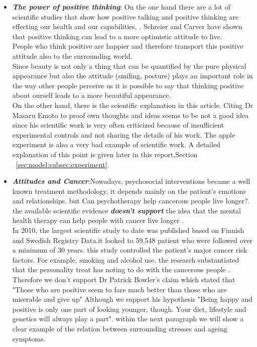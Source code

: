 \documentclass[12pt]{article}
\theoremstyle{plain}
\theoremstyle{definition}
\theoremstyle{remark}
\begin{document}
\begin{itemize}
\item \textit{\textbf{The power of positive thinking}}:
On the one hand there are a lot of scientific studies that show how positive talking and positive thinking are effecting our health and our capabilities. \cite{Macleod2000,Oettingen1991,Ayres1988}. Schreier and Carver \cite{Scheier1993} have shown that positive thinking can lead to a more optimistic attitude to live.\\
People who think positive are happier and therefore transport this positive attitude also to the surrounding world.\\
Since beauty is not only a thing that can be quantified by the pure physical appearance but also the attitude (smiling, posture) plays an important role in the way other people perceive us it is possible to say that thinking positive about ourself leads to a more beautiful appearance.\\
On the other hand, there is the scientific explanation in this article. Citing Dr Masaru Emoto to proof own thoughts and ideas seems to be not a good idea since his scientific work is very often criticized because of insufficient experimental controls and not sharing the details of his work. The apple experiment is also a very bad example of scientific work. A detailed explanation of this point is given later in this report,Section ~\ref{sec:model:subsec:experiment}. 
\end{itemize}


\begin{itemize}
\item \textit{ \textbf{Attitudes and Cancer}}:Nowadays, psychosocial interventions became a well known treatment methodology, it depends mainly on the patient's emotions and relationships. but Can psychotherapy help cancerous people live longer?. the available scientific evidence \textbf{ \textit{doesn't support}} the idea that the mental health therapy can help people with cancer live longer \cite{chow2004does} \cite{ross2002mind} \cite{boyles2011positive}. \\
In 2010, the largest scientific study to date was published based on Finnish and Swedish Registry Data.it looked to 59,548 patient who were followed over a minimum of 30 years. this study controlled the patient's major cancer risk factors. For example, smoking and alcohol use. the research substantiated that the personality treat has noting to do with the cancerous people \cite{nakaya2010personality}. \\
Therefore we don't support Dr Patrick Bowler's claim which stated that "Those who are positive seem to fare much better than those who are miserable and give up" Although we support his hypothesis "Being happy and positive is only one part of looking younger, though. Your diet, lifestyle and genetics will always play a part". within the next paragraph we will show a clear example of the relation between surrounding stresses and ageing symptoms.
\end{itemize}
\end{document}
